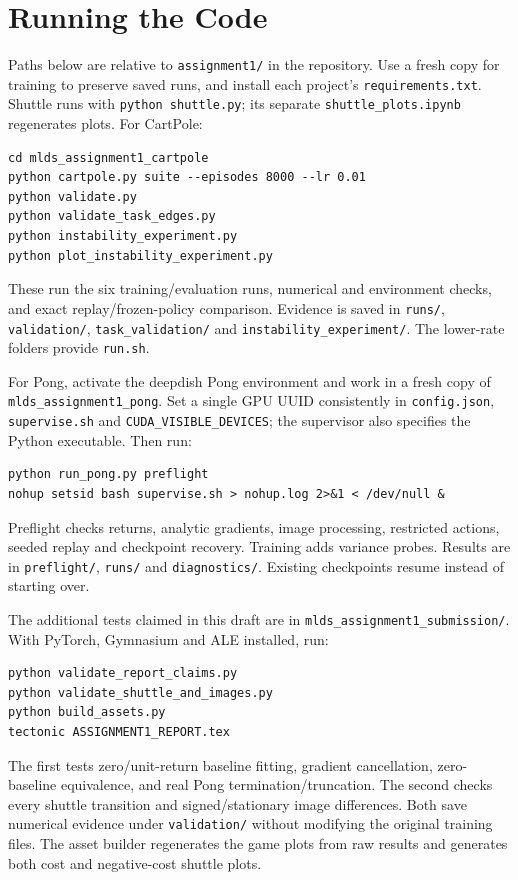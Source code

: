 \documentclass{article}
\begin{document}
\section{Running the Code}
Paths below are relative to \texttt{assignment1/} in the repository. Use a fresh copy for training to preserve saved runs, and install each project's \texttt{requirements.txt}. Shuttle runs with \texttt{python shuttle.py}; its separate \texttt{shuttle\_plots.ipynb} regenerates plots. For CartPole:
\begin{verbatim}
cd mlds_assignment1_cartpole
python cartpole.py suite --episodes 8000 --lr 0.01
python validate.py
python validate_task_edges.py
python instability_experiment.py
python plot_instability_experiment.py
\end{verbatim}
These run the six training/evaluation runs, numerical and environment checks, and exact replay/frozen-policy comparison. Evidence is saved in \texttt{runs/}, \texttt{validation/}, \texttt{task\_validation/} and \texttt{instability\_experiment/}. The lower-rate folders provide \texttt{run.sh}.

For Pong, activate the deepdish Pong environment and work in a fresh copy of \texttt{mlds\_assignment1\_pong}. Set a single GPU UUID consistently in \texttt{config.json}, \texttt{supervise.sh} and \texttt{CUDA\_VISIBLE\_DEVICES}; the supervisor also specifies the Python executable. Then run:
\begin{verbatim}
python run_pong.py preflight
nohup setsid bash supervise.sh > nohup.log 2>&1 < /dev/null &
\end{verbatim}
Preflight checks returns, analytic gradients, image processing, restricted actions, seeded replay and checkpoint recovery. Training adds variance probes. Results are in \texttt{preflight/}, \texttt{runs/} and \texttt{diagnostics/}. Existing checkpoints resume instead of starting over.

The additional tests claimed in this draft are in \texttt{mlds\_assignment1\_submission/}. With PyTorch, Gymnasium and ALE installed, run:
\begin{verbatim}
python validate_report_claims.py
python validate_shuttle_and_images.py
python build_assets.py
tectonic ASSIGNMENT1_REPORT.tex
\end{verbatim}
The first tests zero/unit-return baseline fitting, gradient cancellation, zero-baseline equivalence, and real Pong termination/truncation. The second checks every shuttle transition and signed/stationary image differences. Both save numerical evidence under \texttt{validation/} without modifying the original training files. The asset builder regenerates the game plots from raw results and generates both cost and negative-cost shuttle plots.
\end{document}
